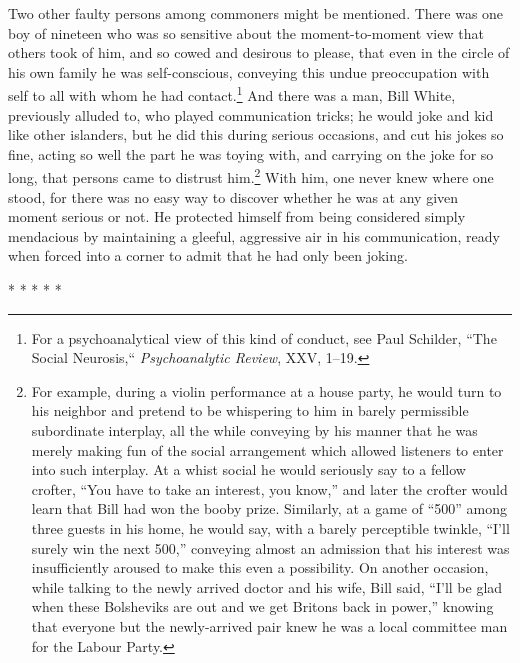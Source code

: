 \documentclass[openany,nobib]{tufte-book}
\begin{document}
Two other faulty persons among commoners might be mentioned. There was
one boy of nineteen who was so sensitive about the moment-to-moment view
that others took of him, and so cowed and desirous to please, that even
in the circle of his own family he was self-conscious, conveying this
undue preoccupation with self to all with whom he had
contact.\footnote{For a psychoanalytical view of this kind of conduct,
  see Paul Schilder, ``The Social Neurosis,`` \emph{Psychoanalytic Review},
  XXV, 1--19.} And there was a man, Bill White, previously alluded to,
who played communication tricks; he would joke and kid like other
islanders, but he did this during serious occasions, and cut his jokes
so fine, acting so well the part he was toying with, and carrying on the
joke for so long, that persons came to distrust him.\footnote{For
  example, during a violin performance at a house party, he would turn
  to his neighbor and pretend to be whispering to him in barely
  permissible subordinate interplay, all the while conveying by his
  manner that he was merely making fun of the social arrangement which
  allowed listeners to enter into such interplay. At a whist social he
  would seriously say to a fellow crofter, ``You have to take an
  interest, you know,'' and later the crofter would learn that Bill had
  won the booby prize. Similarly, at a game of ``500'' among three
  guests in his home, he would say, with a barely perceptible twinkle,
  ``I'll surely win the next 500,'' conveying almost an admission that
  his interest was insufficiently aroused to make this even a
  possibility. On another occasion, while talking to the newly arrived
  doctor and his wife, Bill said, ``I'll be glad when these Bolsheviks
  are out and we get Britons back in power,'' knowing that everyone but
  the newly-arrived pair knew he was a local committee man for the
  Labour Party.} With him, one never knew where one stood, for there was
no easy way to discover whether he was at any given moment serious or
not. He protected himself from being considered simply mendacious by
maintaining a gleeful, aggressive air in his communication, ready when
forced into a corner to admit that he had only been joking.

\vspace{.2in}
\begin{centering}

\Large{* * * * *}

\end{centering}
\vspace{.17in}
\end{document}
